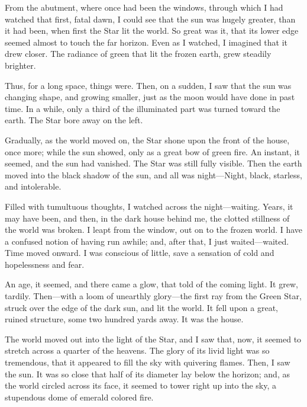 
\clearpage
\label{ch:13}

\begin{ChapterStart}
\null\null
{}
\end{ChapterStart}

From the abutment, where once had been the windows, through which I had watched that first, fatal dawn, I could see that the sun was hugely greater, than it had been, when first the Star lit the world. So great was it, that its lower edge seemed almost to touch the far horizon. Even as I watched, I imagined that it drew closer. The radiance of green that lit the frozen earth, grew steadily brighter.

Thus, for a long space, things were. Then, on a sudden, I saw that the sun was changing shape, and growing smaller, just as the moon would have done in past time. In a while, only a third of the illuminated part was turned toward the earth. The Star bore away on the left.

Gradually, as the world moved on, the Star shone upon the front of the house, once more; while the sun showed, only as a great bow of green fire. An instant, it seemed, and the sun had vanished. The Star was still fully visible. Then the earth moved into the black shadow of the sun, and all was night---Night, black, starless, and intolerable.

Filled with tumultuous thoughts, I watched across the night---waiting. Years, it may have been, and then, in the dark house behind me, the clotted stillness of the world was broken. I leapt from the window, out on to the frozen world. I have a confused notion of having run awhile; and, after that, I just waited---waited. Time moved onward. I was conscious of little, save a sensation of cold and hopelessness and fear.

An age, it seemed, and there came a glow, that told of the coming light. It grew, tardily. Then---with a loom of unearthly glory---the first ray from the Green Star, struck over the edge of the dark sun, and lit the world. It fell upon a great, ruined structure, some two hundred yards away. It was the house.

The world moved out into the light of the Star, and I saw that, now, it seemed to stretch across a quarter of the heavens. The glory of its livid light was so tremendous, that it appeared to fill the sky with quivering flames. Then, I saw the sun. It was so close that half of its diameter lay below the horizon; and, as the world circled across its face, it seemed to tower right up into the sky, a stupendous dome of emerald colored fire.


